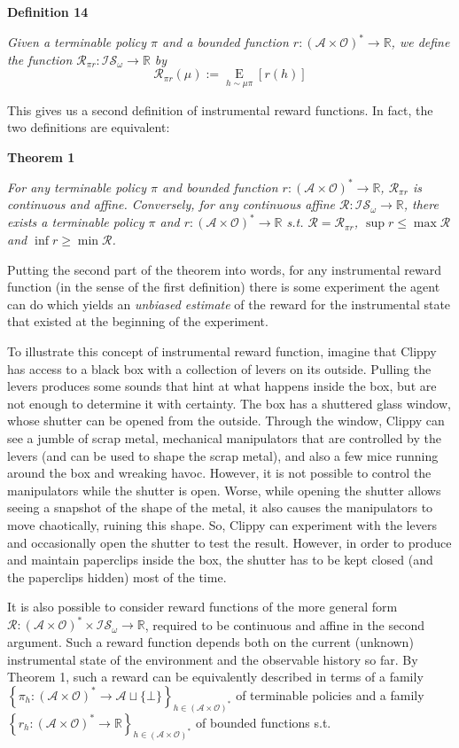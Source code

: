 \documentclass[a4paper]{article}
\newcommand{\Co}[1]{}
\newcommand{\AP}[1]{\left(#1\right)}
\newcommand{\AB}[1]{\left[#1\right]}
\newcommand{\AC}[1]{\left\{#1\right\}}
\newcommand{\Ea}[2]{\underset{#1}{\operatorname{E}}\AB{#2}}
\newcommand{\Reals}{\mathbb{R}}
\newcommand{\A}{\mathcal{A}}
\newcommand{\AX}{\A\sqcup\{\bot\}}
\newcommand{\Ob}{\mathcal{O}}
\newcommand{\AO}{\AP{\A\times\Ob}}
\newcommand{\FH}{\AO^*}
\newcommand{\R}{\mathcal{R}}
\newcommand{\IS}{\mathcal{IS}}
\begin{document}
\textbf{Definition 14}\Co{b}

\textit{Given a terminable policy $\pi$ and a bounded function $r:\FH\rightarrow\Reals$, we define the function $\R_{\pi r}:\IS_\omega\rightarrow\Reals$ by
}\Co{i}
$$\R_{\pi r}(\mu):=\Ea{h\sim\mu\pi}{r(h)}$$

This gives us a second definition of instrumental reward functions. In fact, the two definitions are equivalent:

\textbf{Theorem 1}\Co{b}

\textit{For any terminable policy $\pi$ and bounded function $r:\FH\rightarrow\Reals$, $\R_{\pi r}$ is continuous and affine. Conversely, for any continuous affine $\R:\IS_\omega\rightarrow\Reals$, there exists a terminable policy $\pi$ and $r:\FH\rightarrow\Reals$ s.t. $\R = \R_{\pi r}$, $\sup r \leq \max\R$ and $\inf r \geq \min\R$.}\Co{i}

Putting the second part of the theorem into words, for any instrumental reward function (in the sense of the first definition) there is some experiment the agent can do which yields an \textit{unbiased estimate}\Co{i} of the reward for the instrumental state that existed at the beginning of the experiment.

To illustrate this concept of instrumental reward function, imagine that Clippy has access to a black box with a collection of levers on its outside. Pulling the levers produces some sounds that hint at what happens inside the box, but are not enough to determine it with certainty. The box has a shuttered glass window, whose shutter can be opened from the outside. Through the window, Clippy can see a jumble of scrap metal, mechanical manipulators that are controlled by the levers (and can be used to shape the scrap metal), and also a few mice running around the box and wreaking havoc. However, it is not possible to control the manipulators while the shutter is open. Worse, while opening the shutter allows seeing a snapshot of the shape of the metal, it also causes the manipulators to move chaotically, ruining this shape. So, Clippy can experiment with the levers and occasionally open the shutter to test the result. However, in order to produce and maintain paperclips inside the box, the shutter has to be kept closed (and the paperclips hidden) most of the time.

It is also possible to consider reward functions of the more general form $\R:\FH\times\IS_\omega\rightarrow\Reals$, required to be continuous and affine in the second argument. Such a reward function depends both on the current (unknown) instrumental state of the environment and the observable history so far. By Theorem 1, such a reward can be equivalently described in terms of a family $\AC{\pi_h:\FH\rightarrow\AX}_{h\in\FH}$ of terminable policies and a family $\AC{r_h:\FH\rightarrow\Reals}_{h\in\FH}$ of bounded functions s.t. 
\end{document}
